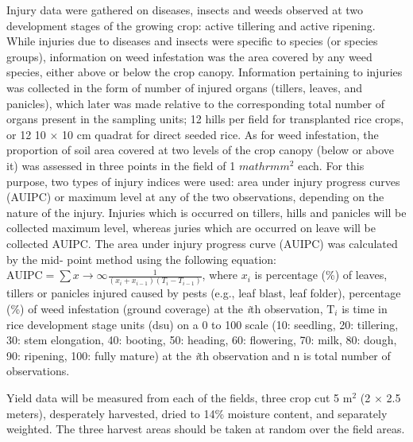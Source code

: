 Injury data were gathered on diseases, insects and weeds observed at two development stages of the growing crop: active tillering and active ripening. While injuries due to diseases and insects were specific to species (or species groups), information on weed infestation was the area covered by any weed species, either above or below the crop canopy. Information pertaining to injuries was collected in the form of number of injured organs (tillers, leaves, and panicles), which later was made relative to the corresponding total number of organs present in the sampling units; 12 hills per field for transplanted rice crops, or 12 10 $\times$ 10 cm quadrat for direct seeded rice. As for weed infestation, the proportion of soil area covered at two levels of the crop canopy (below or above it) was assessed in three points in the field of 1 $mathrm{m}^{2}$ each. For this purpose, two types of injury indices were used: area under injury progress curves (AUIPC) or maximum level at any of the two observations, depending on the nature of the injury. Injuries which is occurred on tillers, hills and panicles will be collected maximum level, whereas juries which are occurred on leave will be collected AUIPC. The area under injury progress curve (AUIPC) was calculated by the mid- point method using the following equation: $\mathrm{AUIPC} = \sum{x\to\infty}\frac{1}{(x_{i} + x_{i-1})(T_{i} - T_{i-1})}$, where $x_i$ is percentage (\%) of leaves, tillers or panicles injured caused by pests (e.g., leaf blast, leaf folder), percentage (\%) of weed infestation (ground coverage) at the \textit{i}th observation, $\mathrm{T}_{i}$ is time in rice development stage units (dsu) on a 0 to 100 scale (10: seedling, 20: tillering, 30: stem elongation, 40: booting, 50: heading, 60: flowering, 70: milk, 80: dough, 90: ripening, 100: fully mature) at the \textit{i}th observation and n is total number of observations.


Yield data will be measured from each of the fields, three crop cut 5 $\mathrm{m}^{2}$ (2 $\times$ 2.5 meters), desperately harvested, dried to 14\% moisture content, and separately weighted. The three harvest areas should be taken at random over the field areas. 

